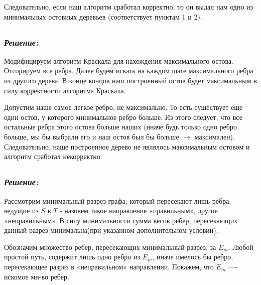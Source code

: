 \documentclass[a4paper, 12pt]{article}
\newcommand*\circled[1]{\tikz[baseline=(char.base)]{
            \node[shape=circle,draw,inner sep=2pt] (char) {#1};}}
\begin{document}
Следовательно, если наш алгоритм сработал корректно, то он выдал нам одно из минимальных остовных деревьев (соответствует пунктам 1 и 2).

\subsection*{\circled{3}} 
\subsubsection*{\textit{Решение:}}

Модифицируем алгоритм Краскала для нахождения максимального остова. Отсорируем все ребра. Далее будем искать на каждом шаге максимального ребра из другого дерева. В конце концов наш построенный остов будет максимальным в силу корректности алгоритма Краскала. 

Допустим наше самое легкое ребро, не максимально. То есть существует еще один остов, у которого минимальное ребро больше. Из этого следует, что все остальные ребра этого остова больше наших (иначе будь только одно ребро больше, мы бы выбрали его и наш остов был бы больше $\to$ максимален). Следовательно, наше построенное дерево не являлось максимальным остовом и алгоритм сработал некорректно.

\subsection*{\circled{4}} 
\subsubsection*{\textit{Решение:}}

Рассмотрим минимальный разрез графа, который пересекают лишь ребра, ведущие из $S$ в $T$ - назовем такое направление «правильным», другое «неправильным». В силу минимальности сумма весов ребер, пересекающих данный разрез минимальна(при указанном дополнительном условии). 

Обозначим множество ребер, пересекающих минимальный разрез, за $E_m$. Любой простой путь, содержит лишь одно ребро из $E_m$, иначе имелось бы ребро, пересекающее разрез в «неправильном» направлении. Покажем, что $E_m$ —- искомое мн-во ребер. 
\end{document}
